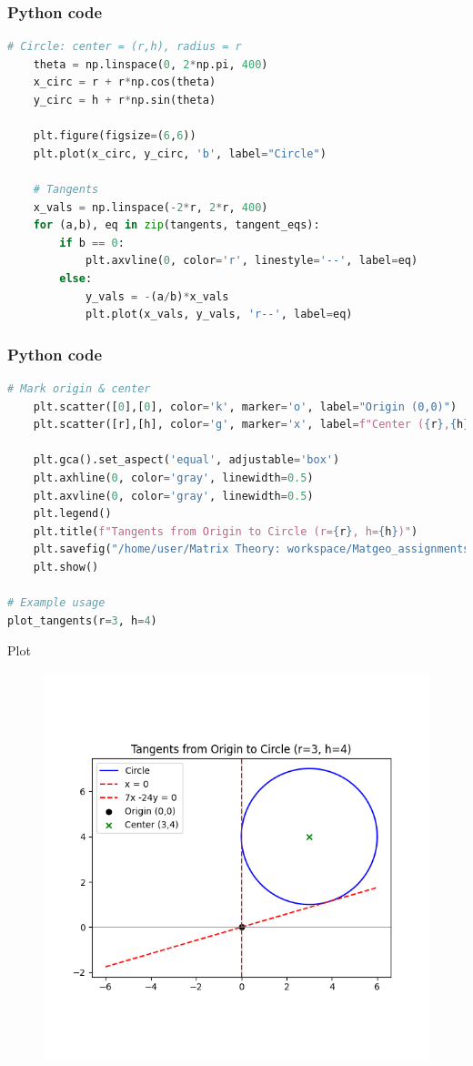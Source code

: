 \documentclass{beamer}
\begin{document}
\begin{frame}[fragile]
    \frametitle{Python code}
    \begin{lstlisting}[language=Python]
# Circle: center = (r,h), radius = r
    theta = np.linspace(0, 2*np.pi, 400)
    x_circ = r + r*np.cos(theta)
    y_circ = h + r*np.sin(theta)

    plt.figure(figsize=(6,6))
    plt.plot(x_circ, y_circ, 'b', label="Circle")

    # Tangents
    x_vals = np.linspace(-2*r, 2*r, 400)
    for (a,b), eq in zip(tangents, tangent_eqs):
        if b == 0:
            plt.axvline(0, color='r', linestyle='--', label=eq)
        else:
            y_vals = -(a/b)*x_vals
            plt.plot(x_vals, y_vals, 'r--', label=eq)
    \end{lstlisting}   
\end{frame}

\begin{frame}[fragile]
    \frametitle{Python code}
    \begin{lstlisting}[language=Python]
# Mark origin & center
    plt.scatter([0],[0], color='k', marker='o', label="Origin (0,0)")
    plt.scatter([r],[h], color='g', marker='x', label=f"Center ({r},{h})")

    plt.gca().set_aspect('equal', adjustable='box')
    plt.axhline(0, color='gray', linewidth=0.5)
    plt.axvline(0, color='gray', linewidth=0.5)
    plt.legend()
    plt.title(f"Tangents from Origin to Circle (r={r}, h={h})")
    plt.savefig("/home/user/Matrix Theory: workspace/Matgeo_assignments/10.7.75/figs/Figure_1.png")
    plt.show()

# Example usage
plot_tangents(r=3, h=4)
    \end{lstlisting}   
\end{frame}

\begin{frame}{Plot}
    \begin{figure}[H]
    \centering
    \includegraphics[width=0.6\columnwidth]{figs/Figure_1.png}
    \label{fig:1}
    \end{figure}
\end{frame}
\end{document}
